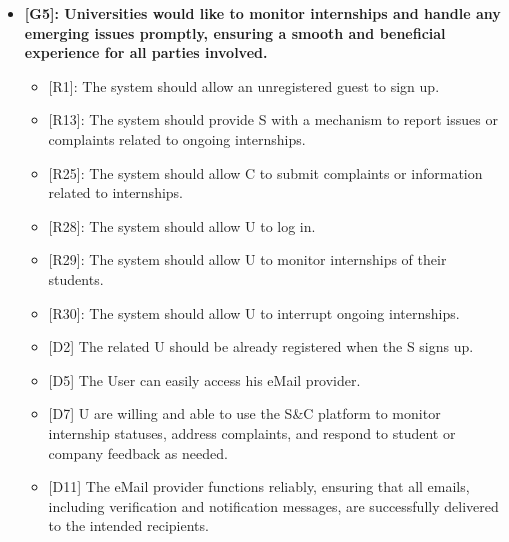 \begin{itemize}
\item
  \textbf{{[}G5{]}: Universities would like to monitor internships and
  handle any emerging issues promptly, ensuring a smooth and beneficial
  experience for all parties involved.}

  \begin{itemize}
  \item
    {[}R1{]}: The system should allow an unregistered guest to sign up.
  \item
    {[}R13{]}: The system should provide S with a mechanism to report
    issues or complaints related to ongoing internships.
  \item
    {[}R25{]}: The system should allow C to submit complaints or
    information related to internships.
  \item
    {[}R28{]}: The system should allow U to log in.
  \item
    {[}R29{]}: The system should allow U to monitor internships of their
    students.
  \item
    {[}R30{]}: The system should allow U to interrupt ongoing
    internships.
  \item
    {[}D2{]} The related U should be already registered when the S signs
    up.
  \item
    {[}D5{]} The User can easily access his eMail provider.
  \item
    {[}D7{]} U are willing and able to use the S\&C platform to monitor
    internship statuses, address complaints, and respond to student or
    company feedback as needed.
  \item
    {[}D11{]} The eMail provider functions reliably, ensuring that all
    emails, including verification and notification messages, are
    successfully delivered to the intended recipients.
  \end{itemize}
\end{itemize}


